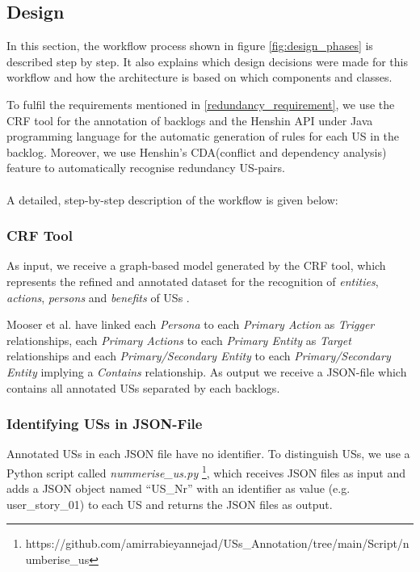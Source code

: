 \subsection{Design}\label{desing}
In this section, the workflow process shown in figure \ref{fig:design_phases} is described step by step. It also explains which design decisions were made for this workflow and how the architecture is based on which components and classes.

To fulfil the requirements mentioned in \ref{redundancy_requirement}, we use the CRF tool \cite{mosser2022modelling} for the annotation of backlogs and the Henshin API \cite{arendt2010henshin} under Java programming language for the automatic generation of rules for each US in the backlog. Moreover, we use Henshin's CDA(conflict and dependency analysis) feature \cite{mens2007analysing} to automatically recognise redundancy US-pairs.\\\\
A detailed, step-by-step description of the workflow is given below:
\subsubsection*{CRF Tool}\label{workflow_crf}
As input, we receive a graph-based model generated by the CRF tool, which represents the refined and annotated dataset for the recognition of \emph{entities}, \emph{actions}, \emph{persons} and \emph{benefits} of USs \cite{mosser2022modelling}.

Mooser et al. have linked each \emph{Persona} to each \emph{Primary Action} as \emph{Trigger} relationships, each \emph{Primary Actions} to each \emph{Primary Entity} as \emph{Target} relationships and each \emph{Primary/Secondary Entity} to each \emph{Primary/Secondary Entity} implying a \emph{Contains} relationship\cite{arulmohan2023extracting}. As output we receive a JSON-file which contains all annotated USs separated by each backlogs.
\subsubsection*{Identifying USs in JSON-File}\label{workflow_nummerize_us}
Annotated USs in each JSON file have no identifier. To distinguish USs, we use a Python script called \textit{nummerise\_us.py} \footnote{https://github.com/amirrabieyannejad/USs\_Annotation/tree/main/Script/numberise\_us}, which receives JSON files as input and adds a JSON object named \enquote{US\_Nr} with an identifier as value (e.g. user\_story\_01) to each US and returns the JSON files as output.
